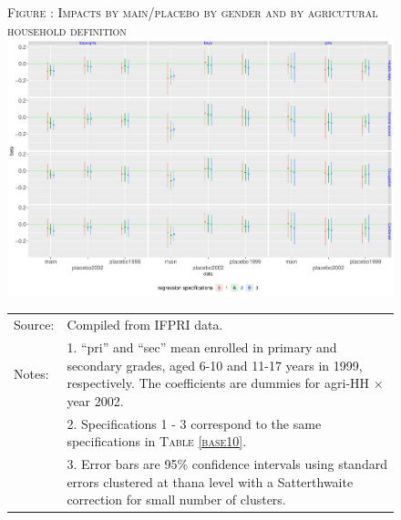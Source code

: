 \documentclass[12pt,letterpaper]{article}
\newcommand{\0}{\ensuremath{\mbox{\boldmath $0$}}}
\begin{document}
{\begin{figure}
\hfil\textsc{\footnotesize Figure \thefigure: Impacts by main/placebo by gender and by agricutural household definition\label{App_MainVsPlaceboPlotsByAgdefByGender}}\\
\hfil \includegraphics[height=.3\paperheight]{Figures/App_MainVsPlaceboPlotsByAgdefByGender.pdf}\\
\renewcommand{\arraystretch}{1}
\hfil\begin{tabular}{>{\hfill\scriptsize}p{1cm}<{}>{\scriptsize}p{11cm}<{\hfill}}
Source: & Compiled from IFPRI data. \\[-1ex]
Notes:& 1. ``pri'' and ``sec'' mean enrolled in primary and secondary grades, aged 6-10 and 11-17 years in 1999, respectively. The coefficients are dummies for agri-HH $\times$ year 2002.\\[-1ex]
& 2. Specifications 1 - 3 correspond to the same specifications in \textsc{Table \ref{base10}}. \\[-1ex]
& 3. Error bars are 95\% confidence intervals using standard errors clustered at thana level with a Satterthwaite correction for small number of clusters.
\end{tabular}
\end{figure}

}
\end{document}
